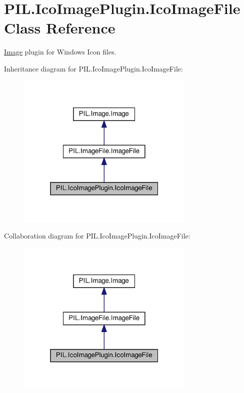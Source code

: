 \hypertarget{classPIL_1_1IcoImagePlugin_1_1IcoImageFile}{}\section{P\+I\+L.\+Ico\+Image\+Plugin.\+Ico\+Image\+File Class Reference}
\label{classPIL_1_1IcoImagePlugin_1_1IcoImageFile}


\hyperlink{namespacePIL_1_1Image}{Image} plugin for Windows Icon files.  




Inheritance diagram for P\+I\+L.\+Ico\+Image\+Plugin.\+Ico\+Image\+File\+:
\nopagebreak
\begin{figure}[H]
\begin{center}
\leavevmode
\includegraphics[width=241pt]{classPIL_1_1IcoImagePlugin_1_1IcoImageFile__inherit__graph}
\end{center}
\end{figure}


Collaboration diagram for P\+I\+L.\+Ico\+Image\+Plugin.\+Ico\+Image\+File\+:
\nopagebreak
\begin{figure}[H]
\begin{center}
\leavevmode
\includegraphics[width=241pt]{classPIL_1_1IcoImagePlugin_1_1IcoImageFile__coll__graph}
\end{center}
\end{figure}
